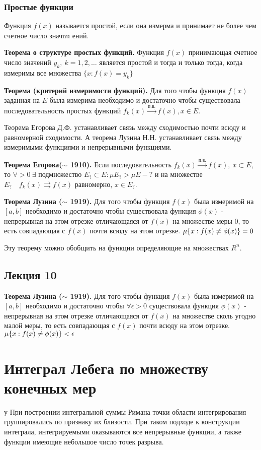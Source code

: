 \documentclass[12pt]{report}
\renewcommand{\[}{$\\\displaystyle}
\renewcommand{\]}{\\$}
\renewcommand{\[}{$\\\displaystyle}
\newcommand{\sep}{,\ }
\newcommand{\tth}[1][]{\textbf{Теорема#1.}}
\begin{document}
\subsubsection{Простые функции}

Функция $f(x)$ называется простой, если она измерма и принимает не более чем счетное число значnu ений.

\tth[ о структуре простых функций] Функция $f(x)$ принимающая счетное число значений $y_k\sep k=1,2,\dots$ является простой и тогда и только тогда, когда измеримы все множества $\{x: f(x) = y_k \}$

\tth[ (критерий измеримости функций)] Для того чтобы функция $f(x)$ заданная на $E$ была измерима необходимо и достаточно чтобы существовала последовательность простых функций $f_k (x) \xrightarrow{\text{п.в.}} f(x), x \in E$.

Теорема Егорова Д.Ф. устанавливает связь между сходимостью почти всюду и равномерной сходимости. А теорема Лузина Н.Н. устанавливает связь между измеримыми функциями и непрерывными функциями.

\tth[ Егорова($\sim$ 1910)] Если последовательность $f_k(x) \xrightarrow{п.в.} f(x) \sep x \subset E$, то $\forall  > 0 \ \exists$ подмножество $ E_? \subset E : \mu E_? > \mu E - ? $ и на множестве $E_? \quad f_k(x) \rightrightarrows f(x)$ равномерно, $x \in E_?$.

\tth[ Лузина ($\sim$ 1919)] Для того чтобы функция $f(x)$ была измеримой на $[a,b]$ необходимо и достаточно чтобы существовала функция $\phi(x)$ - непрерывная на этом отрезке отличающаяся от $f(x)$ на множестве меры 0, то есть совпадающая с $f(x)$ почти всюду на этом отрезке.
\[\mu\{x:f(x) \neq \phi (x)\} = 0\]

Эту теорему можно обобщить на функции определяющие на множествах $R^n$.

\subsection{Лекция 10}

\tth[ Лузина ($\sim$ 1919)] Для того чтобы функция $f(x)$ была измеримой на $[a,b]$ необходимо и достаточно чтобы $\forall \epsilon > 0$ существовала функция $\phi(x)$ - непрерывная на этом отрезке отличающаяся от $f(x)$ на множестве сколь угодно малой меры, то есть совпадающая с $f(x)$ почти всюду на этом отрезке.
\[\mu\{x:f(x) \neq \phi (x)\} < \epsilon\]

\section{Интеграл Лебега по множеству конечных мер}
у
При построении интегральной суммы Римана точки области интегрирования группировались по признаку их близости. При таком подходе к конструкции интеграла, интегрируемыми оказываются все непрерывные функции, а также функции имеющие небольшое число точек разрыва.
\end{document}
